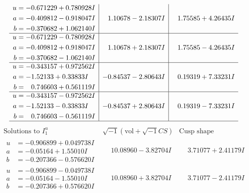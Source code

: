 \documentclass[1p]{elsarticle_modified}
\theoremstyle{definition}
\newcommand{\I}{\sqrt{-1}}
\begin{document}
$$\begin{array}{c|c|c}
\begin{aligned}
u &= -0.671229 + 0.780928 I \\
a &= -0.409812 - 0.918047 I \\
b &= -0.370682 + 1.062140 I\end{aligned}
 & \phantom{-}1.10678 - 2.18307 I & \phantom{-}1.75585 + 4.26435 I \\ \hline\begin{aligned}
u &= -0.671229 - 0.780928 I \\
a &= -0.409812 + 0.918047 I \\
b &= -0.370682 - 1.062140 I\end{aligned}
 & \phantom{-}1.10678 + 2.18307 I & \phantom{-}1.75585 - 4.26435 I \\ \hline\begin{aligned}
u &= -0.343157 + 0.972562 I \\
a &= -1.52133 + 0.33833 I \\
b &= \phantom{-}0.746603 + 0.561119 I\end{aligned}
 & -0.84537 - 2.80643 I & \phantom{-}0.19319 + 7.33231 I \\ \hline\begin{aligned}
u &= -0.343157 - 0.972562 I \\
a &= -1.52133 - 0.33833 I \\
b &= \phantom{-}0.746603 - 0.561119 I\end{aligned}
 & -0.84537 + 2.80643 I & \phantom{-}0.19319 - 7.33231 I\\
 \hline 
 \end{array}$$\newpage$$\begin{array}{c|c|c}  
\text{Solutions to }I^u_{1}& \I (\text{vol} + \sqrt{-1}CS) & \text{Cusp shape}\\
 \hline 
\begin{aligned}
u &= -0.906899 + 0.049738 I \\
a &= -0.05164 + 1.55010 I \\
b &= -0.207366 - 0.576620 I\end{aligned}
 & \phantom{-}10.08960 - 3.82704 I & \phantom{-}3.71077 + 2.41179 I \\ \hline\begin{aligned}
u &= -0.906899 - 0.049738 I \\
a &= -0.05164 - 1.55010 I \\
b &= -0.207366 + 0.576620 I\end{aligned}
 & \phantom{-}10.08960 + 3.82704 I & \phantom{-}3.71077 - 2.41179 I \\ \hline\begin{aligned}

\end{aligned}
\end{array}$$
\end{document}
